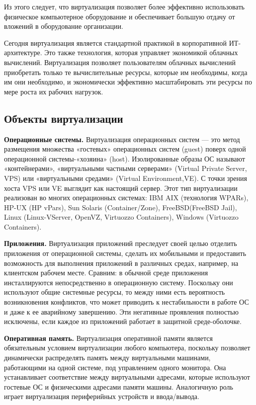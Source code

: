Из этого следует, что виртуализация позволяет более эффективно использовать физическое компьютерное оборудование и обеспечивает большую отдачу от вложений в оборудование организации.

Сегодня виртуализация является стандартной практикой в корпоративной ИТ-архитектуре. Это также технология, которая управляет экономикой облачных вычислений. Виртуализация позволяет пользователям облачных вычислений приобретать только те вычислительные ресурсы, которые им необходимы, когда им они необходимо, и экономически эффективно масштабировать эти ресурсы по мере роста их рабочих нагрузок.

\subsection{Объекты виртуализации}\label{sec:virt_objs}
\textbf{Операционные системы.} 
Виртуализация операционных систем — это метод размещения множества «гостевых» операционных систем (guest) поверх одной операционной системы-«хозяина» (host). Изолированные образы ОС называют «контейнерами», «виртуальными частными серверами» (Virtual Private Server, VPS) или «виртуальными средами» (Virtual Environment,VE). С точки зрения хоста VPS или VE выглядит как настоящий сервер. Этот тип виртуализации реализован во многих операционных системах: IBM AIX (технология WPARs), HP-UX (HP vPars), Sun Solaris (Container/Zone), FreeBSD(FreeBSD Jail), Linux (Linux-VServer, OpenVZ, Virtuozzo Containers), Windows (Virtuozzo Containers).

\textbf{Приложения.}
Виртуализация приложений преследует своей целью отделить приложения от операционной системы, сделать их мобильными и предоставить возможность для выполнения приложений в различных средах, например, на клиентском рабочем месте. Сравним: в обычной среде приложения инсталлируются непосредственно в операционную систему. Поскольку они используют общие системные ресурсы, то между ними есть вероятность возникновения конфликтов, что может приводить к нестабильности в работе ОС и даже к ее аварийному завершению. Эти негативные проявления полностью исключены, если каждое из приложений работает в защитной среде-оболочке.

\textbf{Оперативная память.}
Виртуализация оперативной памяти является обязательным условием виртуализации любого компьютера, поскольку позволяет динамически распределять память между виртуальными машинами, работающими на одной системе, под управлением одного монитора. Она устанавливает соответствие между виртуальными адресами, которые используют гостевые ОС и физическими адресами памяти машины. Аналогичную роль играет виртуализация периферийных устройств и ввода/вывода.

